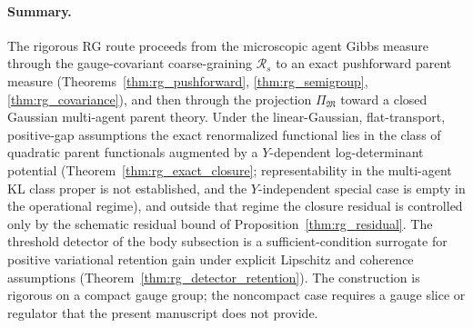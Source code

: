 \documentclass[11pt]{article}
\begin{document}
\paragraph{Summary.}
The rigorous RG route proceeds from the microscopic agent Gibbs measure through the gauge-covariant coarse-graining $\mathcal{R}_s$ to an exact pushforward parent measure (Theorems~\ref{thm:rg_pushforward}, \ref{thm:rg_semigroup}, \ref{thm:rg_covariance}), and then through the projection $\Pi_\mathfrak{M}$ toward a closed Gaussian multi-agent parent theory. Under the linear-Gaussian, flat-transport, positive-gap assumptions the exact renormalized functional lies in the class of quadratic parent functionals augmented by a $Y$-dependent log-determinant potential (Theorem~\ref{thm:rg_exact_closure}; representability in the multi-agent KL class proper is not established, and the $Y$-independent special case is empty in the operational regime), and outside that regime the closure residual is controlled only by the schematic residual bound of Proposition~\ref{thm:rg_residual}. The threshold detector of the body subsection is a sufficient-condition surrogate for positive variational retention gain under explicit Lipschitz and coherence assumptions (Theorem~\ref{thm:rg_detector_retention}). The construction is rigorous on a compact gauge group; the noncompact case requires a gauge slice or regulator that the present manuscript does not provide.



\end{document}
